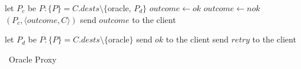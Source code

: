 \begin{algorithm}[h!]
\begin{distribalgo}[1]
        \vspace{1.0mm}
    
            \STATE let $P_c$ be $P : \{P\} = C.dests \setminus \{$oracle, $P_d\}$
                \STATE $outcome \leftarrow ok$
            \ELSE
                \STATE $outcome \leftarrow nok$
            \ENDIF
            \STATE \rmcast$(P_c, \langle outcome, C \rangle )$
            \STATE send $outcome$ to the client
        
        \vspace{1.0mm}
        
            \STATE let $P_d$ be $P : \{P\} = C.dests \setminus \{$oracle$\}$
                \STATE send $ok$    to the client
            \ELSE
                \STATE send $retry$ to the client
            \ENDIF
            
            
        \ENDIF
    \ENDINDENT
\ENDINDENT

\caption{\dssmr\ Oracle Proxy}
\label{alg:oracle_proxy}
\end{distribalgo}
\end{algorithm}